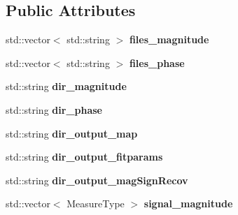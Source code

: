 \subsection*{Public Attributes}
\begin{DoxyCompactItemize}
\item 
\hypertarget{struct_ox_1_1_tomato_options_ad123055506ec1c4c73b397a5f771d2e7}{std\-::vector$<$ std\-::string $>$ {\bfseries files\-\_\-magnitude}}\label{struct_ox_1_1_tomato_options_ad123055506ec1c4c73b397a5f771d2e7}

\item 
\hypertarget{struct_ox_1_1_tomato_options_acd13f26343647d05164a33cb5b4163f3}{std\-::vector$<$ std\-::string $>$ {\bfseries files\-\_\-phase}}\label{struct_ox_1_1_tomato_options_acd13f26343647d05164a33cb5b4163f3}

\item 
\hypertarget{struct_ox_1_1_tomato_options_aeffcb3fc69397596ce852699a2f3b05d}{std\-::string {\bfseries dir\-\_\-magnitude}}\label{struct_ox_1_1_tomato_options_aeffcb3fc69397596ce852699a2f3b05d}

\item 
\hypertarget{struct_ox_1_1_tomato_options_a92cabcc150b94b5b4c3dbea6e8ecb846}{std\-::string {\bfseries dir\-\_\-phase}}\label{struct_ox_1_1_tomato_options_a92cabcc150b94b5b4c3dbea6e8ecb846}

\item 
\hypertarget{struct_ox_1_1_tomato_options_af31a50b6e23004912a1512812c823a29}{std\-::string {\bfseries dir\-\_\-output\-\_\-map}}\label{struct_ox_1_1_tomato_options_af31a50b6e23004912a1512812c823a29}

\item 
\hypertarget{struct_ox_1_1_tomato_options_ab8e2816968affd97a0ba0b13c44c4c02}{std\-::string {\bfseries dir\-\_\-output\-\_\-fitparams}}\label{struct_ox_1_1_tomato_options_ab8e2816968affd97a0ba0b13c44c4c02}

\item 
\hypertarget{struct_ox_1_1_tomato_options_ae90b66c7e606c677bbf2f55c83743730}{std\-::string {\bfseries dir\-\_\-output\-\_\-mag\-Sign\-Recov}}\label{struct_ox_1_1_tomato_options_ae90b66c7e606c677bbf2f55c83743730}

\item 
\hypertarget{struct_ox_1_1_tomato_options_a657de7a6c7607a1727ed38d79306ecd1}{std\-::vector$<$ Measure\-Type $>$ {\bfseries signal\-\_\-magnitude}}\label{struct_ox_1_1_tomato_options_a657de7a6c7607a1727ed38d79306ecd1}


\end{DoxyCompactItemize}
